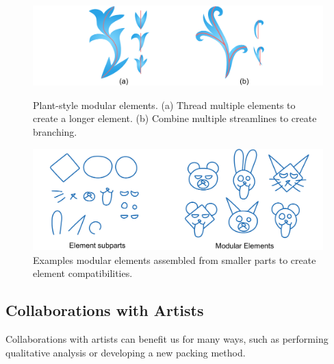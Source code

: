\begin{figure}[t]
\centering
\includegraphics[width=1.0\textwidth]{figures/conclusions/thread_branch_3.pdf}
\caption[Element threading and branching]
{ \label{thread_branch} 
\nnewtext
{
Plant-style modular elements.
(a) Thread multiple elements to create a longer element.
(b) Combine multiple streamlines to create branching.
}
}
\includegraphics[width=1.0\textwidth]{figures/conclusions/modular.pdf}
\caption[Modular elements]
{ \label{modular_element} 
\nnewtext
{
Examples modular elements assembled from smaller parts to create element compatibilities.
}
}
\end{figure}




\subsection{Collaborations with Artists}

Collaborations with artists can benefit us for many ways,
such as performing qualitative analysis or developing a new packing method.


